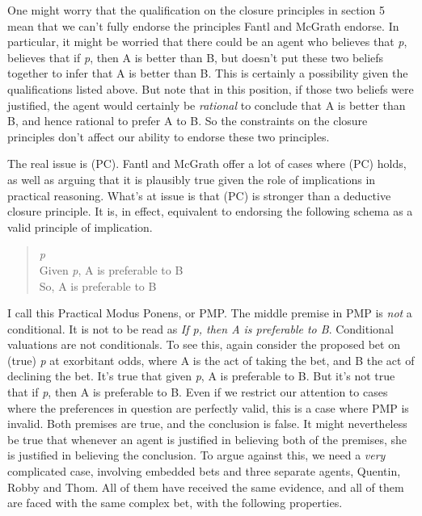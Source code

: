 \documentclass[
  11pt,
  letterpaper,
  DIV=11,
  numbers=noendperiod,
  twoside]{scrartcl}
\begin{document}
One might worry that the qualification on the closure principles in
section 5 mean that we can't fully endorse the principles Fantl and
McGrath endorse. In particular, it might be worried that there could be
an agent who believes that \emph{p}, believes that if \emph{p}, then A
is better than B, but doesn't put these two beliefs together to infer
that A is better than B. This is certainly a possibility given the
qualifications listed above. But note that in this position, if those
two beliefs were justified, the agent would certainly be \emph{rational}
to conclude that A is better than B, and hence rational to prefer A to
B. So the constraints on the closure principles don't affect our ability
to endorse these two principles.

The real issue is (PC). Fantl and McGrath offer a lot of cases where
(PC) holds, as well as arguing that it is plausibly true given the role
of implications in practical reasoning. What's at issue is that (PC) is
stronger than a deductive closure principle. It is, in effect,
equivalent to endorsing the following schema as a valid principle of
implication.

\begin{quote}
\emph{p}\\
Given \emph{p}, A is preferable to B\\
So, A is preferable to B
\end{quote}

I call this Practical Modus Ponens, or PMP. The middle premise in PMP is
\emph{not} a conditional. It is not to be read as \emph{If p, then A is
preferable to B}. Conditional valuations are not conditionals. To see
this, again consider the proposed bet on (true) \emph{p} at exorbitant
odds, where A is the act of taking the bet, and B the act of declining
the bet. It's true that given \emph{p}, A is preferable to B. But it's
not true that if \emph{p}, then A is preferable to B. Even if we
restrict our attention to cases where the preferences in question are
perfectly valid, this is a case where PMP is invalid. Both premises are
true, and the conclusion is false. It might nevertheless be true that
whenever an agent is justified in believing both of the premises, she is
justified in believing the conclusion. To argue against this, we need a
\emph{very} complicated case, involving embedded bets and three separate
agents, Quentin, Robby and Thom. All of them have received the same
evidence, and all of them are faced with the same complex bet, with the
following properties.
\end{document}
